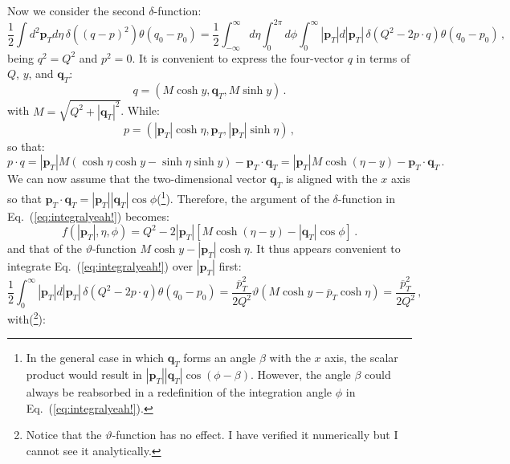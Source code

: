 \documentclass[10pt,a4paper]{article}
\begin{document}
Now we consider the second $\delta$-function:
\begin{equation}\label{eq:integralyeah!}
\frac12\int d^2\mathbf{p}_T d\eta\,\delta((q-p)^2)\theta(q_0-p_0)=\frac12\int_{-\infty}^\infty d\eta
\int_0^{2\pi} d\phi \int_0^\infty|\mathbf{p}_T|d|\mathbf{p}_T|\,\delta(Q^2-2p\cdot q) \theta(q_0-p_0)\,,
\end{equation}
being $q^2=Q^2$ and $p^2=0$. It is convenient to express the
four-vector $q$ in terms of $Q$, $y$, and $\mathbf{q}_T$:
\begin{equation}\label{eq:qexplicit}
q=\left(M\cosh y,\mathbf{q}_T,M\sinh y\right)\,.
\end{equation}
with $M=\sqrt{Q^2+|\mathbf{q}_T|^2}$. While:
\begin{equation}\label{eq:pexplicit}
p=\left(|\mathbf{p}_T|\cosh\eta,\mathbf{p}_T,|\mathbf{p}_T|\sinh\eta\right)\,,
\end{equation}
so that:
\begin{equation}
p\cdot q=|\mathbf{p}_T|M\left(\cosh\eta \cosh y-\sinh\eta\sinh
  y\right)-\mathbf{p}_T\cdot
\mathbf{q}_T=|\mathbf{p}_T|M\cosh\left(\eta - y\right)-\mathbf{p}_T\cdot \mathbf{q}_T\,.
\end{equation}
We can now assume that the two-dimensional vector $\mathbf{q}_T$ is
aligned with the $x$ axis so that
$\mathbf{p}_T\cdot \mathbf{q}_T =
|\mathbf{p}_T||\mathbf{q}_T|\cos\phi$(\footnote{In
  the general case in which $\mathbf{q}_T$ forms an angle $\beta$ with
  the $x$ axis, the scalar product would result in
  $|\mathbf{p}_T||\mathbf{q}_T|\cos(\phi-\beta)$. However, the angle
  $\beta$ could always be reabsorbed in a redefinition of the
  integration angle $\phi$ in
  Eq.~(\ref{eq:integralyeah!}).}). Therefore, the argument of the
$\delta$-function in Eq.~(\ref{eq:integralyeah!}) becomes:
\begin{equation}\label{eq:deltaargument}
f(|\mathbf{p}_T|,\eta,\phi) = Q^2-2 |\mathbf{p}_T|\left[M\cosh\left(\eta - y\right)-|\mathbf{q}_T|\cos\phi\right]\,.
\end{equation}
and that of the $\vartheta$-function
$M\cosh y-|\mathbf{p}_T|\cosh\eta$. It thus appears convenient to
integrate Eq.~(\ref{eq:integralyeah!}) over $|\mathbf{p}_T|$ first:
\begin{equation}\label{eq:firstintegral}
\frac12\int_0^\infty|\mathbf{p}_T|d|\mathbf{p}_T|\,\delta(Q^2-2p\cdot q) \theta(q_0-p_0)=\frac{\overline{p}_T^2}{2Q^2}\vartheta(M\cosh y-\overline{p}_T\cosh\eta)=\frac{\overline{p}_T^2}{2Q^2}\,,
\end{equation}
with(\footnote{Notice that the $\vartheta$-function has no effect. I
  have verified it numerically but I cannot see it analytically.}):
\end{document}
